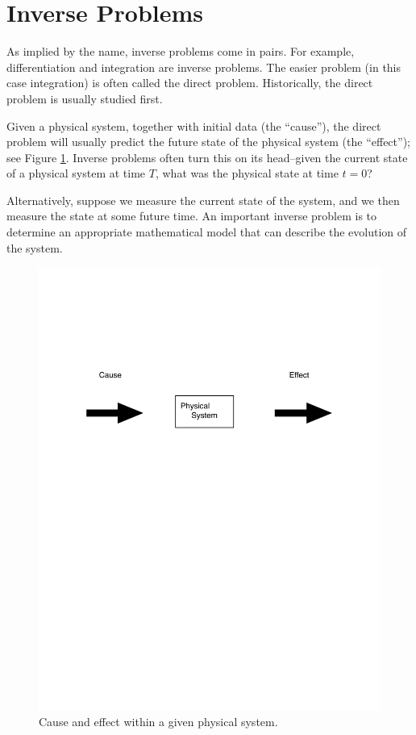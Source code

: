 \section*{Inverse Problems}
As implied by the name, inverse problems come in pairs.
For example, differentiation and integration are inverse problems.
The easier problem (in this case integration) is often called the direct problem.
Historically, the direct problem is usually studied first.

Given a physical system, together with initial data (the ``cause''), the direct problem will usually predict the future state of the physical system (the ``effect''); see Figure \ref{fig:cause_and_effect}.
Inverse problems often turn this on its head--given the current state of a physical system at time $T$, what was the physical state at time $t = 0$?  

Alternatively, suppose we measure the current state of the system, and we then measure the state at some future time.
An important inverse problem is to determine an appropriate mathematical model that can describe the evolution of the system.

\begin{figure}
\centering
\includegraphics[width=\textwidth]{figures/cause_and_effect.pdf}
\caption{Cause and effect within a given physical system.}
\label{fig:cause_and_effect}
\end{figure}

